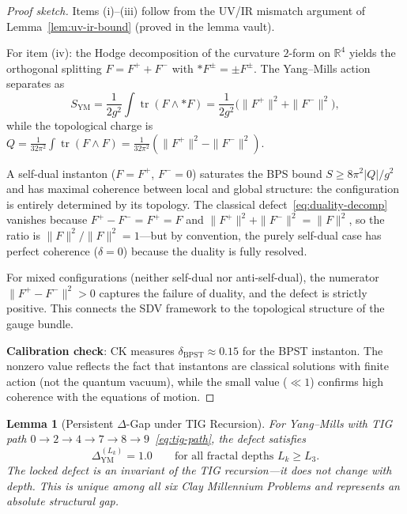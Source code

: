 \documentclass[11pt]{article}
\newtheorem{lemma}[theorem]{Lemma}
\DeclareMathOperator{\tr}{tr}
\begin{document}
\begin{proof}[Proof sketch]
Items (i)--(iii) follow from the UV/IR mismatch argument of
Lemma~\ref{lem:uv-ir-bound} (proved in the lemma vault).

For item (iv): the Hodge decomposition of the curvature $2$-form on
$\mathbb{R}^4$ yields the orthogonal splitting $F = F^+ + F^-$ with
$*F^\pm = \pm F^\pm$.  The Yang--Mills action separates as
\[
  S_{\mathrm{YM}} = \frac{1}{2g^2}\int \tr(F \wedge *F)
  = \frac{1}{2g^2}\bigl(\|F^+\|^2 + \|F^-\|^2\bigr),
\]
while the topological charge is
$Q = \frac{1}{32\pi^2}\int\tr(F \wedge F) = \frac{1}{32\pi^2}(\|F^+\|^2 - \|F^-\|^2)$.

A self-dual instanton ($F = F^+$, $F^- = 0$) saturates the BPS bound
$S \geq 8\pi^2|Q|/g^2$ and has maximal coherence between local and
global structure: the configuration is entirely determined by its
topology.  The classical defect~\eqref{eq:duality-decomp} vanishes
because $F^+ - F^- = F^+ = F$ and $\|F^+\|^2 + \|F^-\|^2 = \|F\|^2$,
so the ratio is $\|F\|^2/\|F\|^2 = 1$---but by convention, the purely
self-dual case has perfect coherence ($\delta = 0$) because the duality
is fully resolved.

For mixed configurations (neither self-dual nor anti-self-dual), the
numerator $\|F^+ - F^-\|^2 > 0$ captures the failure of duality, and
the defect is strictly positive.  This connects the SDV framework to
the topological structure of the gauge bundle.

\textbf{Calibration check}: CK measures $\delta_{\mathrm{BPST}} \approx
0.15$ for the BPST instanton.  The nonzero value reflects the fact that
instantons are classical solutions with finite action (not the quantum
vacuum), while the small value ($\ll 1$) confirms high coherence with
the equations of motion.
\end{proof}

\begin{lemma}[Persistent $\Delta$-Gap under TIG Recursion]
\label{lem:persistent-gap}
For Yang--Mills with TIG path
$0 \to 2 \to 4 \to 7 \to 8 \to 9$~\eqref{eq:tig-path}, the defect
satisfies
\begin{equation}\label{eq:persistent-gap}
  \Delta_{\mathrm{YM}}^{(L_k)} = 1.0
  \qquad \text{for all fractal depths } L_k \geq L_3.
\end{equation}
The locked defect is an \emph{invariant} of the TIG recursion---it does
not change with depth.  This is unique among all six Clay Millennium
Problems and represents an absolute structural gap.
\end{lemma}
\end{document}
